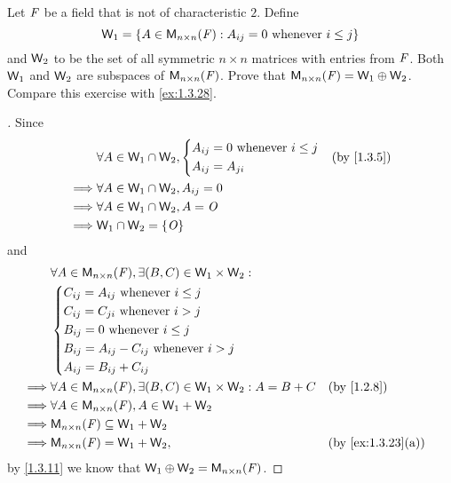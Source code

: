 \begin{ex}\label{ex:1.3.29}
  Let \(\mathit{F}\) be a field that is not of characteristic \(2\).
  Define
  \[
    \mathsf{W}_1 = \left\lbrace A \in \mathsf{M}_{{n} \times n}({\mathit{F}}) : A_{i j} = 0 \text{ whenever } i \leq j\right\rbrace
  \]
  and \(\mathsf{W}_2\) to be the set of all symmetric \(n \times n\) matrices with entries from \(\mathit{F}\).
  Both \(\mathsf{W}_1\) and \(\mathsf{W}_2\) are subspaces of \(\mathsf{M}_{{n} \times n}({\mathit{F}})\).
  Prove that \(\mathsf{M}_{{n} \times n}({\mathit{F}}) = \mathsf{W}_1 \oplus \mathsf{W}_2\).
  Compare this exercise with \cref{ex:1.3.28}.
\end{ex}

\begin{proof}[]
  Since
  \begin{align*}
             & \forall A \in \W_1 \cap \W_2, \begin{dcases}
      A_{i j} = 0 \text{ whenever } i \leq j \\
      A_{i j} = A_{j i}
    \end{dcases} &  & \text{(by \cref{1.3.5})} \\
    \implies & \forall A \in \W_1 \cap \W_2, A_{i j} = 0                                              \\
    \implies & \forall A \in \W_1 \cap \W_2, A = \zm                                                  \\
    \implies & \W_1 \cap \W_2 = \set{\zm}
  \end{align*}
  and
  \begin{align*}
             & \forall A \in \ms{n}{n}{\F}, \exists (B, C) \in \W_1 \times \W_2 :                                                \\
             & \begin{dcases}
      C_{i j} = A_{i j} \text{ whenever } i \leq j        \\
      C_{i j} = C_{j i} \text{ whenever } i > j           \\
      B_{i j} = 0 \text{ whenever } i \leq j              \\
      B_{i j} = A_{i j} - C_{i j} \text{ whenever } i > j \\
      A_{i j} = B_{i j} + C_{i j}
    \end{dcases}                                                                                        \\
    \implies & \forall A \in \ms{n}{n}{\F}, \exists (B, C) \in \W_1 \times \W_2 : A = B + C &  & \text{(by \cref{1.2.8})}        \\
    \implies & \forall A \in \ms{n}{n}{\F}, A \in \W_1 + \W_2                                                                    \\
    \implies & \ms{n}{n}{\F} \subseteq \W_1 + \W_2                                                                               \\
    \implies & \ms{n}{n}{\F} = \W_1 + \W_2,                                                 &  & \text{(by \cref{ex:1.3.23}(a))}
  \end{align*}
  by \cref{1.3.11} we know that \(\mathsf{W}_1 \oplus \mathsf{W}_2 = \mathsf{M}_{{n} \times n}({\mathit{F}})\).
\end{proof}

